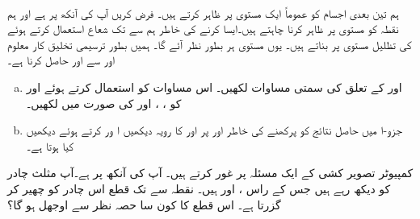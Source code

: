 \\
ہم تین بعدی  اجسام کو عموماً  ایک  مستوی پر ظاہر کرتے ہیں۔ فرض کریں آپ کی آنکھ  پر ہے  اور ہم نقطہ  کو مستوی  پر ظاہر کرنا چاہتے ہیں۔ایسا کرنے کی خاطر ہم  سے  تک شعاع استعمال کرتے ہوئے  کی تظلیل مستوی پر بناتے ہیں۔ یوں مستوی ہر  بطور  نظر آئے گا۔  ہمیں بطور  ترسیمی تخلیق کار  معلوم  اور  سے  اور  حاصل کرنا ہے۔
\begin{enumerate}[a.]
\item
{} اور  کے تعلق کی سمتی مساوات لکھیں۔ اس مساوات کو استعمال کرتے ہوئے  اور  کو ، ،    اور  کی صورت میں لکھیں۔
\item
جزو-ا میں حاصل نتائج کو  پرکھنے کی خاطر  اور  پر  اور  کا رویہ دیکھیں  ا ور   کرتے ہوئے دیکھیں کیا ہوتا ہے۔
\end{enumerate}
کمپیوٹر  تصویر کشی    کے ایک مسئلہ پر غور کرتے ہیں۔ آپ کی آنکھ  پر ہے۔آپ مثلث چادر کو دیکھ رہے ہیں جس کے راس ،   اور   ہیں۔ نقطہ  سے  تک قطع اس چادر  کو چھیر کر  گزرتا ہے۔ اس قطع  کا کون سا حصہ نظر سے اوجھل ہو گا؟

